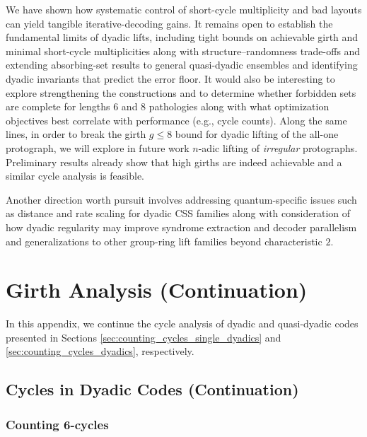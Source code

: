 \documentclass[11pt]{article}
\theoremstyle{plain}
\theoremstyle{plain}
\theoremstyle{definition}
\numberwithin{theo}{section}
\newcounter{ara}
\newcounter{rom}
\begin{document}
We have shown how systematic control of short-cycle multiplicity and bad layouts can yield tangible iterative-decoding gains. It remains open to establish the fundamental limits of dyadic lifts, including tight bounds on achievable girth and minimal short-cycle multiplicities along with structure–randomness trade-offs and extending absorbing-set results to general quasi-dyadic ensembles and identifying dyadic invariants that predict the error floor. It would also be interesting to explore 
strengthening the constructions and to determine whether forbidden sets are complete for lengths 6 and 8 pathologies along with what optimization objectives best correlate with performance (e.g., cycle counts). 
Along the same lines, in order to break the girth $g \leq 8$ bound for dyadic lifting of the all-one protograph, we will explore in future work $n$-adic lifting of {\em irregular} protographs.
Preliminary results already show that high girths are indeed achievable and a similar cycle analysis is feasible.

Another direction worth pursuit involves addressing quantum-specific issues such as distance and rate scaling for dyadic CSS families along with consideration of how dyadic regularity may improve syndrome extraction and decoder parallelism and generalizations to other group-ring lift families beyond characteristic $2$.


\appendix

\section{Girth Analysis (Continuation)}
\label{appendix:girth_analysis}

In this appendix, we continue the cycle analysis of dyadic and quasi-dyadic codes presented in Sections \ref{sec:counting_cycles_single_dyadics} and \ref{sec:counting_cycles_dyadics}, respectively.

\subsection{Cycles in Dyadic Codes (Continuation)}
\label{sec:counting_cycles_single_dyadics_continuation}

\subsubsection{Counting 6-cycles}
\label{sec:counting_cycles_counting_6cycles_single_dyadics}
\end{document}
